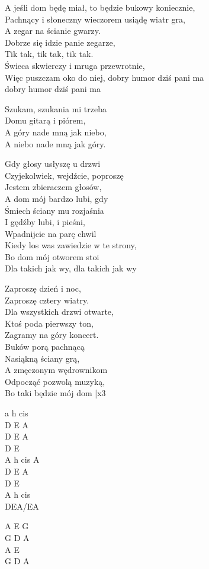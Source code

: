
\begin{text}
    A jeśli dom będę miał, to będzie bukowy koniecznie,\\
    Pachnący i słoneczny wieczorem usiądę wiatr gra,\\
    A zegar na ścianie gwarzy.\\
    Dobrze się idzie panie zegarze,\\
    Tik tak, tik tak, tik tak.\\
    Świeca skwierczy i mruga przewrotnie,\\
    Więc puszczam oko do niej, dobry humor dziś pani ma\\
    dobry humor dziś pani ma

    \ifchorded{\hfill\break}
    \vin Szukam, szukania mi trzeba\\
    \vin Domu gitarą i piórem,\\
    \vin A góry nade mną jak niebo,\\
    \vin A niebo nade mną jak góry.

    Gdy głosy usłyszę u drzwi\\
    Czyjekolwiek, wejdźcie, poproszę\\
    Jestem zbieraczem głosów,\\
    A dom mój bardzo lubi, gdy\\
    Śmiech ściany mu rozjaśnia\\
    I gędźby lubi, i pieśni,\\
    Wpadnijcie na parę chwil\\
    Kiedy los was zawiedzie w te strony,\\
    Bo dom mój otworem stoi\\
    Dla takich jak wy, dla takich jak wy

    Zaproszę dzień i noc,\\
    Zaproszę cztery wiatry.\\
    Dla wszystkich drzwi otwarte,\\
    Ktoś poda pierwszy ton,\\
    Zagramy na góry koncert.\\
    Buków porą pachnącą\\
    Nasiąkną ściany grą,\\
    A zmęczonym wędrownikom\\
    Odpocząć pozwolą muzyką,\\
    Bo taki będzie mój dom |x3
\end{text}
\begin{chord}
    a h cis\\
    D E A\\
    D E A\\
    D E\\
    A h cis A\\
    D E A\\
    D E\\
    A h cis\\
    DEA/EA

    A E G\\
    G D A\\
    A E\\
    G D A
\end{chord}